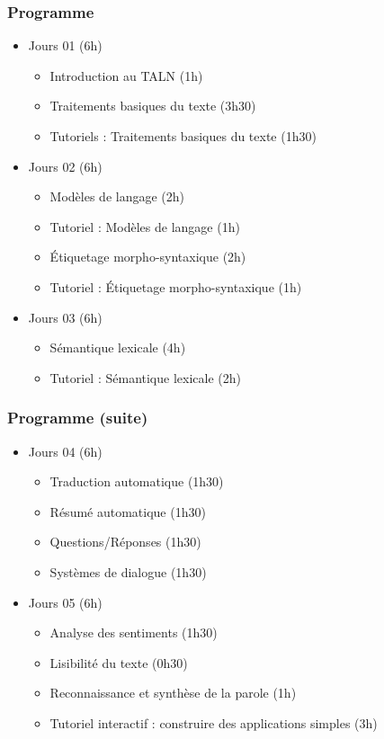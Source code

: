 \documentclass{beamer}
\begin{document}
\begin{frame}
\frametitle{Programme}

\begin{itemize}
	\item Jours 01 (6h)
	\begin{itemize}
		\item Introduction au TALN (1h)
		\item Traitements basiques du texte (3h30)
		\item Tutoriels : Traitements basiques du texte (1h30)
	\end{itemize}

	\item Jours 02 (6h)
	\begin{itemize}
		\item Modèles de langage (2h)
		\item Tutoriel : Modèles de langage (1h)
		\item Étiquetage morpho-syntaxique (2h)
		\item Tutoriel : Étiquetage morpho-syntaxique (1h)
	\end{itemize}

	\item Jours 03 (6h)
	\begin{itemize}
		\item Sémantique lexicale (4h)
		\item Tutoriel : Sémantique lexicale (2h)
	\end{itemize}
\end{itemize}

\end{frame}

\begin{frame}
	\frametitle{Programme (suite)}
	
	\begin{itemize}
		\item Jours 04 (6h)
		\begin{itemize}
			\item Traduction automatique  (1h30)
			\item Résumé automatique (1h30)
			\item Questions/Réponses (1h30)
			\item Systèmes de dialogue (1h30)
		\end{itemize}
		
		\item Jours 05 (6h)
		\begin{itemize}
			\item Analyse des sentiments (1h30)
			\item Lisibilité du texte (0h30)
			\item Reconnaissance et synthèse de la parole (1h)
			\item Tutoriel interactif : construire des applications simples (3h)
		\end{itemize}
		
	\end{itemize}
	
\end{frame}
\end{document}
